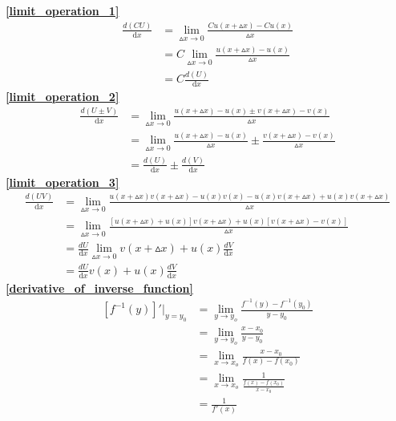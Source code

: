 \textbf{\large \ref{limit_operation_1}}
\begin{displaymath}
    \begin{split}
        \frac{d(CU)}{\mathrm{d}{x}}&=\lim\limits_{\vartriangle x\to 0}\frac{Cu(x+\vartriangle x)-Cu(x)}{\vartriangle x}\\
        &=C\lim\limits_{\vartriangle x\to 0}\frac{u(x+\vartriangle x)-u(x)}{\vartriangle x}\\
        &=C\frac{d(U)}{\mathrm{d}{x}}
    \end{split}
\end{displaymath}
\textbf{\large \ref{limit_operation_2}}
\begin{displaymath}
    \begin{split}
        \frac{d(U\pm V)}{\mathrm{d}{x}}&=\lim\limits_{\vartriangle x\to 0}\frac{u(x+\vartriangle x)-u(x)\pm v(x+\vartriangle x)-v(x)}{\vartriangle x}\\
        &=\lim\limits_{\vartriangle x\to 0}\frac{u(x+\vartriangle x)-u(x)}{\vartriangle x}\pm\frac{v(x+\vartriangle x)-v(x)}{\vartriangle x}\\
        &=\frac{d(U)}{\mathrm{d}{x}}\pm \frac{d(V)}{\mathrm{d}{x}}
    \end{split}
\end{displaymath}
\textbf{\large \ref{limit_operation_3}}
\begin{displaymath}
    \begin{split}
        \frac{d(UV)}{\mathrm{d}{x}}&=\lim\limits_{\vartriangle x\to 0}\frac{u(x+\vartriangle x)v(x+\vartriangle x)-u(x)v(x)-u(x)v(x+\vartriangle x)+u(x)v(x+\vartriangle x)}{\vartriangle x}\\
            &=\lim\limits_{\vartriangle x\to 0}\frac{\left[u(x+\vartriangle x)+u(x)\right]v(x+\vartriangle x)+u(x)\left[v(x+\vartriangle x)-v(x)\right]}{\vartriangle x}\\
            &=\frac{dU}{\mathrm{d}{x}}\lim\limits_{\vartriangle x\to 0}v(x+\vartriangle x)+u(x)\frac{dV}{\mathrm{d}{x}}\\
            &=\frac{dU}{\mathrm{d}{x}}v(x)+u(x)\frac{dV}{\mathrm{d}{x}}
    \end{split}
\end{displaymath}
\textbf{\large \ref{derivative_of_inverse_function}}
\begin{displaymath}
    \begin{split}
        \left[f^{-1}(y)\right]'|_{y=y_0}&=\lim\limits_{y\to y_o}\frac{f^{-1}(y)-f^{-1}(y_0)}{y-y_0}\\
        &=\lim\limits_{y\to y_o}\frac{x-x_0}{y-y_0}\\
        &=\lim\limits_{x\to x_o}\frac{x-x_0}{f(x)-f(x_0)}\\
        &=\lim\limits_{x\to x_o}\frac{1}{\frac{f(x)-f(x_0)}{x-x_0}}\\
        &=\frac{1}{f'(x)}\\
    \end{split}
\end{displaymath}

